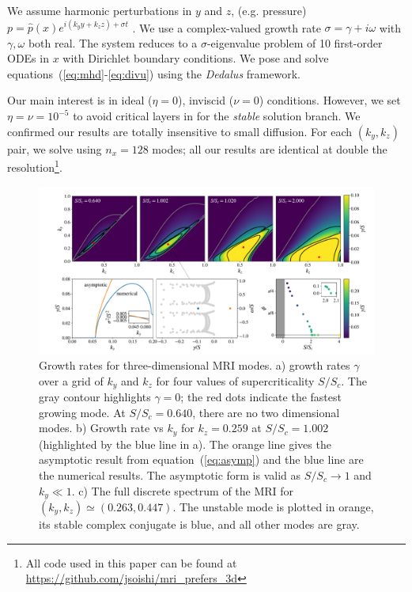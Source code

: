 \documentclass[aps,prl,reprint,superscriptaddress]{revtex4-1}
\newcommand{\SSC}{S/S_{c}}
\begin{document}
We assume harmonic perturbations in $y$ and $z$, (e.g. pressure) $p = \hat{p}(x) e^{i(k_y y + k_z z) + \sigma t}$ . 
We use a complex-valued growth rate $\sigma = \gamma + i\omega$ with $\gamma, \omega$ both real. 
The system reduces to a $\sigma$-eigenvalue problem of 10 first-order ODEs in $x$ with Dirichlet boundary conditions.
We pose and solve equations~(\ref{eq:mhd}-\ref{eq:divu}) using the \emph{Dedalus} framework. 

Our main interest is in ideal ($\eta = 0$), inviscid ($\nu = 0$) conditions.
However, we set $\eta=\nu=10^{-5}$ to avoid critical layers in for the \textit{stable} solution branch.
We confirmed our results are totally insensitive to small diffusion. 
For each $(k_y, k_z)$ pair, we solve using $n_x = 128$ modes; all our results are identical at double the resolution\footnote{All code used in this paper can be found at \protect\url{https://github.com/jsoishi/mri\_prefers\_3d}}.
\begin{figure}[ht]
  \includegraphics[width=\textwidth]{fig_1.pdf}
  \caption{Growth rates for three-dimensional MRI modes. a) growth rates $\gamma$ over a grid of $k_y$ and $k_z$ for four values of supercriticality $\SSC$. The gray contour highlights $\gamma = 0$; the red dots indicate the fastest growing mode. At $\SSC = 0.640$, there are no two dimensional modes. b) Growth rate vs $k_y$ for $k_z = 0.259$ at $\SSC = 1.002$ (highlighted by the blue line in a). The orange line gives the asymptotic result from equation~(\ref{eq:asymp}) and the blue line are the numerical results. The asymptotic form is valid as $\SSC \to 1$ and $k_y \ll 1$. c) The full discrete spectrum of the MRI for $(k_y, k_z) \simeq (0.263, 0.447)$. The unstable mode is plotted in orange, its stable complex conjugate is blue, and all other modes are gray.}
  \label{fig:growth_rate}
\end{figure}
\end{document}
